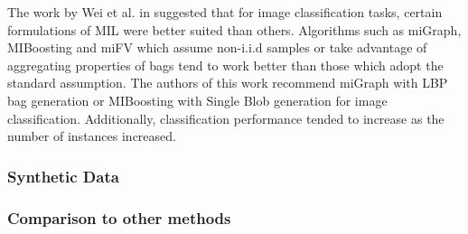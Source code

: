 The work by Wei et al. in \cite{Wei2016ImageBagGenerators} suggested that  for image classification tasks, certain formulations of MIL were better suited than others.  Algorithms such as miGraph, MIBoosting and miFV which assume non-i.i.d samples or take advantage of aggregating properties of bags tend to work better than those which adopt the standard assumption.  The authors of this work recommend miGraph with LBP bag generation or MIBoosting with Single Blob generation for image classification.  Additionally, classification performance tended to increase as the number of instances increased.

\subsubsection{Synthetic Data}

\subsubsection{Comparison to other methods}